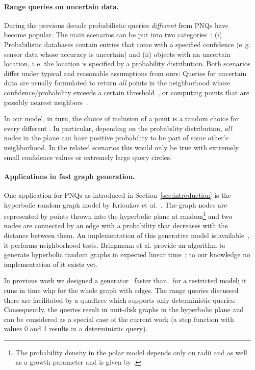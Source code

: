 \documentclass{llncs}
\newcommand{\ie}{i.\,e.\xspace}
\newcommand{\eg}{e.\,g.\xspace}
\newcommand{\etal}{et al.\xspace}
\begin{document}
\paragraph{Range queries on uncertain data.}
During the previous decade probabilistic queries \emph{different} from PNQs have become popular.
The main scenarios can be put into two categories~\cite{pei2008query}: (i) Probabilistic databases contain entries
that come with a specified confidence (\eg sensor data whose accuracy is uncertain) and
(ii) objects with an uncertain location, \ie the location is specified by a probability distribution.
Both scenarios differ under typical and reasonable assumptions from ours: 
Queries for uncertain data are usually formulated to return \emph{all} points in the neighborhood
whose confidence/probability exceeds a certain threshold~\cite{kriegel2007probabilistic},
or computing points that are possibly nearest neighbors~\cite{agarwal2013nearest}.

In our model, in turn, the choice of inclusion of a point  is a random choice for every different . In particular, 
depending on the probability distribution, \emph{all}
nodes in the plane can have positive probability to be part of some other's neighborhood.
In the related scenarios this would only be true with extremely small confidence values or extremely
large query circles.

\paragraph{Applications in fast graph generation.}
One application for PNQs as introduced in Section~\ref{sec:introduction} is the hyperbolic random graph model by Krioukov \etal~\cite{Krioukov2010}. The  graph nodes are represented by points 
thrown into the hyperbolic plane at random\footnote{The probability density in the polar model depends only on radii  and  as well as a growth parameter  and is given by .} and
two nodes are connected by an edge with a probability that decreases with
the distance between them. An implementation of this generative model is
available~\cite{Aldecoa2015}, it performs  neighborhood tests. 
Bringmann et al. provide an algorithm to generate hyperbolic random graphs in expected linear time~\cite{bringmann2015geometric}; to our knowledge no implementation of it exists yet.

In previous work we designed a  
generator~\cite{Looz2015HRG} faster than~\cite{Aldecoa2015} for a restricted model; it runs in 
time whp for the whole graph with  edges. The range queries discussed there are facilitated by a quadtree 
which supports only deterministic queries. Consequently, the queries result in unit-disk graphs in the hyperbolic plane 
and can be considered as a special case of the current work (a step function  with values 0 and 1 results in a deterministic query).
\end{document}
